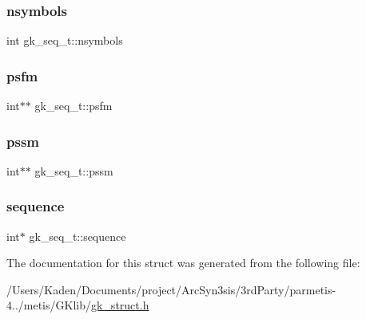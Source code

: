 \mbox{\label{a00674_a876b72b49af40e66b978e33f87cda044}} 
\subsubsection{\texorpdfstring{nsymbols}{nsymbols}}
{\footnotesize\ttfamily int gk\+\_\+seq\+\_\+t\+::nsymbols}

\mbox{\label{a00674_a2f3676712f6cbb159642884a3dff7eec}} 
\subsubsection{\texorpdfstring{psfm}{psfm}}
{\footnotesize\ttfamily int$\ast$$\ast$ gk\+\_\+seq\+\_\+t\+::psfm}

\mbox{\label{a00674_aca3f51322bd7246f338394a442e37e7c}} 
\subsubsection{\texorpdfstring{pssm}{pssm}}
{\footnotesize\ttfamily int$\ast$$\ast$ gk\+\_\+seq\+\_\+t\+::pssm}

\mbox{\label{a00674_a5a803ced386350dd152f047531035f81}} 
\subsubsection{\texorpdfstring{sequence}{sequence}}
{\footnotesize\ttfamily int$\ast$ gk\+\_\+seq\+\_\+t\+::sequence}



The documentation for this struct was generated from the following file\+:\begin{DoxyCompactItemize}
\item 
/\+Users/\+Kaden/\+Documents/project/\+Arc\+Syn3sis/3rd\+Party/parmetis-\/4../metis/\+G\+Klib/\hyperlink{a00080}{gk\+\_\+struct.\+h}\end{DoxyCompactItemize}
